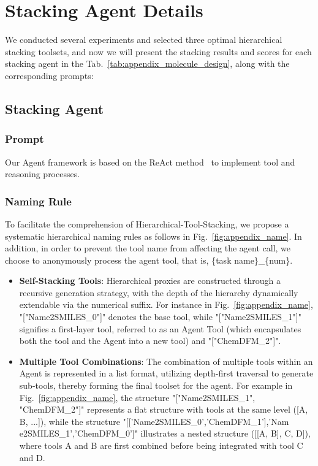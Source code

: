 

\section{Stacking Agent Details}
\label{Stacking Agent Details}

We conducted several experiments and selected three optimal hierarchical stacking toolsets, and now we will present the stacking results and scores for each stacking agent in the Tab.~\ref{tab:appendix_molecule_design}, along with the corresponding prompts:
\subsection{Stacking Agent}
\subsubsection{Prompt}
Our Agent framework is based on the ReAct method~\cite{yao2023reactsynergizingreasoningacting} to implement tool  and reasoning processes. 
\subsubsection{Naming Rule}
To facilitate the comprehension of Hierarchical-Tool-Stacking, we propose a systematic hierarchical naming rules as follows in Fig.~\ref{fig:appendix_name}. In addition, in order to prevent the tool name from affecting the agent call, we choose to anonymously process the agent tool, that is, \{task name\}\_\{num\}.
\begin{itemize}
    \item \textbf{Self-Stacking Tools}: Hierarchical proxies are constructed through a recursive generation strategy, with the depth of the hierarchy dynamically extendable via the numerical suffix. For instance in Fig.~\ref{fig:appendix_name}, "["Name2SMILES\_0"]" denotes the base tool, while "["Name2SMILES\_1"]" signifies a first-layer tool, referred to as an Agent Tool (which encapsulates both the tool and the Agent into a new tool) and "["ChemDFM\_2"]".

    \item \textbf{Multiple Tool Combinations}: The combination of multiple tools within an Agent is represented in a list format, utilizing depth-first traversal to generate sub-tools, thereby forming the final toolset for the agent. For example in Fig.~\ref{fig:appendix_name}, the structure "["Name2SMILES\_1", "ChemDFM\_2"]" represents a flat structure with tools at the same level ([A, B, ...]), while the structure "[['Name2SMILES\_0','ChemDFM\_1'],'Nam
    e2SMILES\_1','ChemDFM\_0']" illustrates a nested structure ([[A, B], C, D]), where tools A and B are first combined before being integrated with tool C and D.
\end{itemize}



